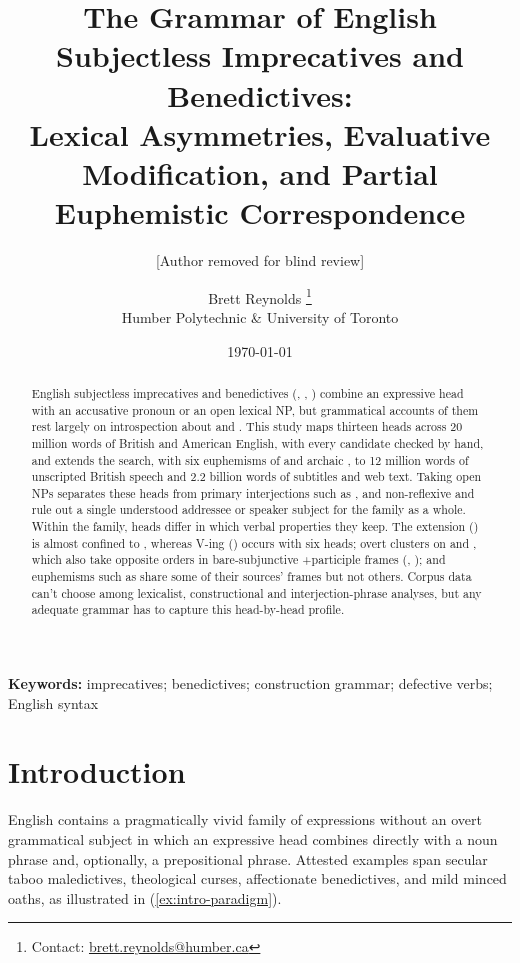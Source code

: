 \documentclass[12pt]{article}
\title{The Grammar of English Subjectless Imprecatives and Benedictives:\\Lexical Asymmetries, Evaluative Modification, and Partial Euphemistic Correspondence}
\author{[Author removed for blind review]}
\author{Brett Reynolds \orcidlink{0000-0003-0073-7195}%
\thanks{Contact: \href{mailto:brett.reynolds@humber.ca}{brett.reynolds@humber.ca}}\\
Humber Polytechnic \& University of Toronto}
\date{\today}
\begin{document}
\maketitle

\begin{abstract}
English subjectless imprecatives and benedictives (, , ) combine an expressive head with an accusative pronoun or an open lexical NP, but grammatical accounts of them rest largely on introspection about  and . This study maps thirteen heads across 20 million words of British and American English, with every candidate checked by hand, and extends the search, with six euphemisms of  and archaic , to 12 million words of unscripted British speech and 2.2 billion words of subtitles and web text. Taking open NPs separates these heads from primary interjections such as , and non-reflexive  and  rule out a single understood addressee or speaker subject for the family as a whole. Within the family, heads differ in which verbal properties they keep. The  extension () is almost confined to , whereas  V-ing () occurs with six heads; overt  clusters on  and , which also take opposite orders in bare-subjunctive +participle frames (, ); and euphemisms such as  share some of their sources' frames but not others. Corpus data can't choose among lexicalist, constructional and interjection-phrase analyses, but any adequate grammar has to capture this head-by-head profile.
\end{abstract}

\noindent\textbf{Keywords:} imprecatives; benedictives; construction grammar; defective verbs; English syntax

\section{Introduction}
\label{sec:intro}

English contains a pragmatically vivid family of expressions without an overt grammatical subject in which an expressive head combines directly with a noun phrase and, optionally, a prepositional phrase. Attested examples span secular taboo maledictives, theological curses, affectionate benedictives, and mild minced oaths, as illustrated in (\ref{ex:intro-paradigm}).
\end{document}
